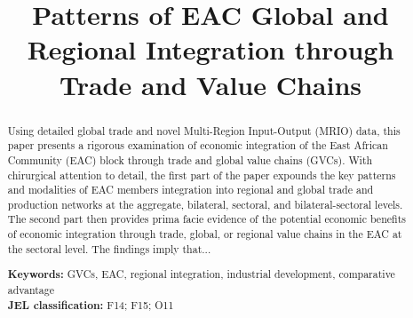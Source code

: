 \documentclass[a4paper]{article}
\title{\textbf{Patterns of EAC Global and Regional Integration through Trade and Value Chains}}
\date{}
\begin{document}
\maketitle


\begin{abstract}
Using detailed global trade and novel Multi-Region Input-Output (MRIO) data, %
this paper presents a rigorous examination of economic integration of the East African Community (EAC) block through trade and global value chains (GVCs). With chirurgical attention to detail, the first part of the paper expounds the key patterns and modalities of EAC members integration into regional and global trade and production networks at the aggregate, bilateral, sectoral, and bilateral-sectoral levels. The second part then provides prima facie evidence of the potential economic benefits of economic integration through trade, global, or regional value chains in the EAC at the sectoral level. The findings imply that...



\noindent \textbf{Keywords:} GVCs, EAC, regional integration, industrial development, comparative advantage\\
\textbf{JEL classification:} F14; F15; O11
\end{abstract}
\end{document}
